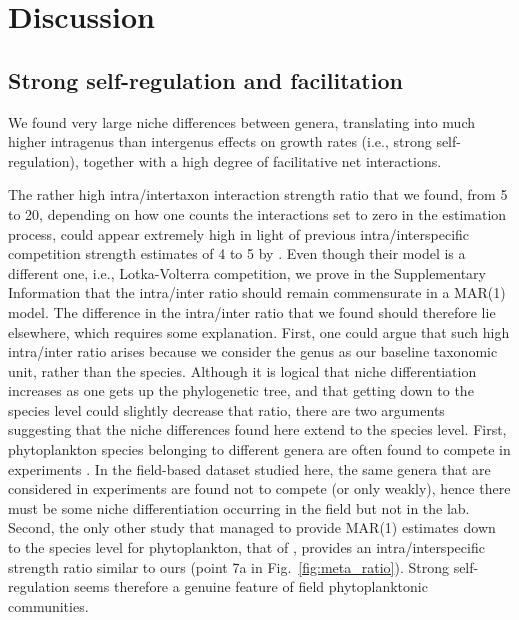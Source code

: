 \documentclass[10pt]{article}
\begin{document}
\section*{Discussion}

\subsection*{Strong self-regulation and facilitation}

We found very large niche differences between genera, translating
into much higher intragenus than intergenus effects on growth rates
(i.e., strong self-regulation), together with a high degree of facilitative
net interactions.

The rather high intra/intertaxon interaction strength ratio \citep{levine_importance_2009}
that we found, from 5 to 20, depending on how one counts the interactions
set to zero in the estimation process, could appear extremely high
in light of previous intra/interspecific competition strength estimates
of 4 to 5 by \citet{adler_competition_2018}. Even though their model
is a different one, i.e., Lotka-Volterra competition, we prove in
the Supplementary Information that the intra/inter ratio should remain
commensurate in a MAR(1) model. The difference in the intra/inter ratio that we found
should therefore lie elsewhere, which requires some explanation. First,
one could argue that such high intra/inter ratio arises because we
consider the genus as our baseline taxonomic unit, rather than the
species. Although it is logical that niche differentiation increases
as one gets up the phylogenetic tree, and that getting down to the
species level could slightly decrease that ratio, there are two arguments
suggesting that the niche differences found here extend to the species
level. First, phytoplankton species belonging to different genera
are often found to compete in experiments \citep{titman_ecological_1976,tilman_phytoplankton_1982,descamps-julien_stable_2005}. In the field-based
dataset studied here, the same genera that are considered in experiments
are found not to compete (or only weakly), hence there must be some
niche differentiation occurring in the field but not in the lab. Second,
the only other study that managed to provide MAR(1) estimates down
to the species level for phytoplankton, that of \citet{huber_role_2006},
provides an intra/interspecific strength ratio similar to ours (point
7a in Fig.~\ref{fig:meta_ratio}). Strong self-regulation seems therefore
a genuine feature of field phytoplanktonic communities.
\end{document}
